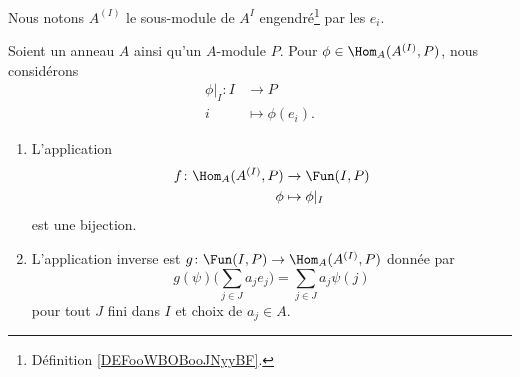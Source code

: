 \begin{definition}      \label{DEFooBMEPooFsCHgb}
    Nous notons \( A^{(I)}\) le sous-module de \( A^I\) engendré\footnote{Définition \ref{DEFooWBOBooJNyyBF}.} par les \( e_i\).
\end{definition}

\begin{theorem}      \label{THOooPDZCooJnHbOd}
    Soient un anneau \( A\) ainsi qu'un \( A\)-module \( P\). Pour \( \phi\in\Hom_A(A^{(I)}, P)\), nous considérons
    \begin{equation}
        \begin{aligned}
            \phi|_I\colon I&\to P \\
            i&\mapsto \phi(e_i). 
        \end{aligned}
    \end{equation}
    \begin{enumerate}
        \item
            
    L'application
    \begin{equation}
        \begin{aligned}
            f\colon \Hom_A(A^{(I)},P)&\to \Fun(I,P) \\
            \phi&\mapsto \phi|_I 
        \end{aligned}
    \end{equation}
    est une bijection.
\item
    L'application inverse est \( g\colon \Fun(I,P)\to \Hom_A(A^{(I)},P) \) donnée par
    \begin{equation}
        g(\psi)\big( \sum_{j\in J}a_je_j \big)=\sum_{j\in J}a_j\psi(j)
    \end{equation}
    pour tout \( J\) fini dans \( I\) et choix de \( a_j\in A\).
    \end{enumerate}
\end{theorem}

